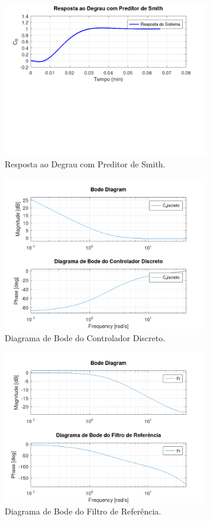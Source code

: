 \documentclass[a4paper,12pt]{article}
\begin{document}
\begin{figure}[H]
    \centering
    \includegraphics[width=0.8\textwidth]{figura_resposta_degrau.png}
    \caption{Resposta ao Degrau com Preditor de Smith.}
    \label{fig:resposta_degrau}
\end{figure}

\begin{figure}[H]
    \centering
    \includegraphics[width=0.8\textwidth]{figura_bode_controlador.png}
    \caption{Diagrama de Bode do Controlador Discreto.}
    \label{fig:bode_controlador}
\end{figure}

\begin{figure}[H]
    \centering
    \includegraphics[width=0.8\textwidth]{figura_bode_filtro.png}
    \caption{Diagrama de Bode do Filtro de Referência.}
    \label{fig:bode_filtro}
\end{figure}
\end{document}

